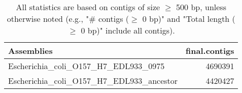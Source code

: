 \documentclass[12pt,a4paper]{article}
\begin{document}
\begin{table}[ht]
\begin{center}
\caption{All statistics are based on contigs of size $\geq$ 500 bp, unless otherwise noted (e.g., "\# contigs ($\geq$ 0 bp)" and "Total length ($\geq$ 0 bp)" include all contigs).}
\begin{tabular}{|l*{1}{|r}|}
\hline
Assemblies & final.contigs \\ \hline
Escherichia\_coli\_O157\_H7\_EDL933\_0975 & 4690391 \\ \hline
Escherichia\_coli\_O157\_H7\_EDL933\_ancestor & 4420427 \\ \hline
\end{tabular}
\end{center}
\end{table}
\end{document}
